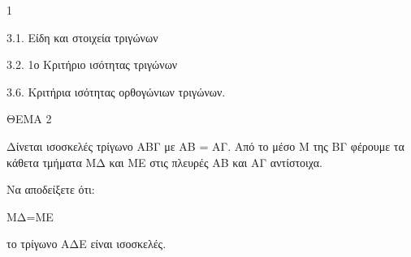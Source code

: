\begin{ylh}{1}
    \item 3.1. Είδη και στοιχεία τριγώνων
    \item 3.2. 1ο Κριτήριο ισότητας τριγώνων
    \item 3.6. Κριτήρια ισότητας ορθογώνιων τριγώνων.
\end{ylh}

ΘΕΜΑ 2

Δίνεται ισοσκελές τρίγωνο ΑΒΓ με ΑΒ = ΑΓ. Από το μέσο Μ της ΒΓ φέρουμε τα κάθετα τμήματα ΜΔ και ΜΕ στις πλευρές ΑΒ και ΑΓ αντίστοιχα.

Να αποδείξετε ότι:

\begin{alist}
\item ΜΔ=ΜΕ 

\item το τρίγωνο ΑΔΕ είναι ισοσκελές. 
\end{alist}

